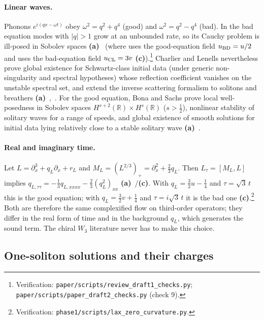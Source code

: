 \documentclass[11pt,a4paper]{article}
\newcommand{\lab}[1]{{\normalfont\sffamily\footnotesize\bfseries(#1)}}
\newcommand{\La}{\lab{a}}
\newcommand{\Lc}{\lab{c}}
\newcommand{\scr}[1]{\nolinkurl{#1}}
\newcommand{\chk}[1]{\footnote{\raggedright Verification: #1.}}
\theoremstyle{remark}
\begin{document}
\paragraph{Linear waves.} Phonons $e^{i(qx-\omega t)}$ obey $\omega^2=q^2+q^4$ (good) and $\omega^2=q^2-q^4$ (bad). In the bad equation modes with $|q|>1$ grow at an unbounded rate, so its Cauchy problem is ill-posed in Sobolev spaces \La~\cite{BD,CL-WW} (where \cite{BD} uses the good-equation field $u_{\rm BD}=u/2$ and \cite{CL-WW} uses the bad-equation field $u_{\rm CL}=3v$ \Lc).\chk{\scr{paper/scripts/review_draft1_checks.py}; \scr{paper/scripts/paper_draft2_checks.py} (check 9)} Charlier and Lenells nevertheless prove global existence for Schwartz-class initial data (under generic non-singularity and spectral hypotheses) whose reflection coefficient vanishes on the unstable spectral set, and extend the inverse scattering formalism to solitons and breathers \La~\cite[Thms~2.8--2.12]{CL-WW},~\cite{CL-SOL}. For the good equation, Bona and Sachs prove local well-posedness in Sobolev spaces $H^{s+2}(\mathbb R)\times H^s(\mathbb R)$ ($s>\tfrac12$), nonlinear stability of solitary waves for a range of speeds, and global existence of smooth solutions for initial data lying relatively close to a stable solitary wave \La~\cite{BonaSachs}.

\paragraph{Real and imaginary time.} Let $L=\partial_x^3+q_L\partial_x+r_L$ and $M_L=(L^{2/3})_+=\partial_x^2+\tfrac23q_L$. Then $L_{\tau}=[M_L,L]$ implies $q_{L,\tau\tau}=-\tfrac13q_{L,xxxx}-\tfrac23(q_L^2)_{xx}$ \La~\cite{Zak}/\Lc. With $q_L=\tfrac32u-\tfrac14$ and $\tau=\sqrt3\,t$ this is the good equation; with $q_L=\tfrac32v+\tfrac14$ and $\tau=i\sqrt3\,t$ it is the bad one \Lc.\chk{\scr{phase1/scripts/lax_zero_curvature.py}} Both are therefore the same complexified flow on third-order operators; they differ in the real form of time and in the background $q_L$, which generates the sound term. The chiral $W_3$ literature \cite{BHK} never has to make this choice.

\subsection{One-soliton solutions and their charges}
\end{document}
